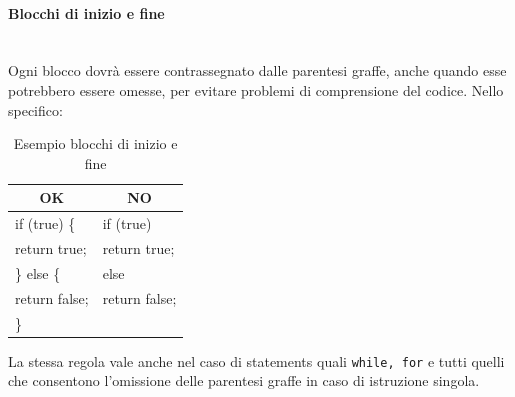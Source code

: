 \paragraph{Blocchi di inizio e fine}\mbox{}\\[0.4cm]
Ogni blocco dovrà essere contrassegnato dalle parentesi graffe, anche quando esse potrebbero essere omesse, per evitare problemi di comprensione del codice. Nello specifico:
\begin{table} [H]
	\begin{center}
		\begin{tabular}{ | l | l |}
			\multicolumn{1}{c}{\textbf{OK}}&\multicolumn{1}{c}{\textbf{NO}}\\ 
			\hline
			if (true) \{ 			   &  if (true)\\
			\hspace{0.5cm}return true;          & \hspace{0.5cm}return true;\\
			\} else \{ 					& else\\
			\hspace{0.5cm}return false;          & \hspace{0.5cm}return false;\\
			\}								& \\
			\hline
		\end{tabular}
	\end{center}
	\caption{Esempio blocchi di inizio e fine}
\end{table}
La stessa regola vale anche nel caso di statements quali \texttt{while, for} e tutti quelli che consentono l’omissione delle parentesi graffe in caso di istruzione singola.
